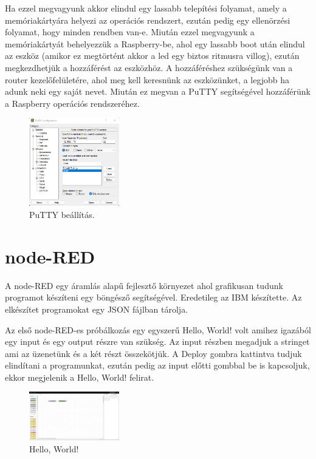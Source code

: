 \documentclass[a4paper,12pt,oneside]{report}
\begin{document}
Ha ezzel megvagyunk akkor elindul egy lassabb telepítési folyamat, amely a memóriakártyára helyezi az operációs rendszert, ezután pedig
egy ellenörzési folyamat, hogy minden rendben van-e.
Miután ezzel megvagyunk a memóriakártyát behelyezzük a Raspberry-be, ahol egy lassabb boot után elindul az eszköz (amikor ez megtörtént
akkor a led egy biztos ritmusra villog), ezután megkezdhetjük a hozzáférést az eszközhöz. 
A hozzáféréshez szükségünk van a router kezelőfelületére, ahol meg kell keresnünk az eszközünket, a legjobb ha adunk neki
egy saját nevet. Miután ez megvan a PuTTY segítségével hozzáférünk a Raspberry operációs rendszeréhez.

\begin{figure}[htbp]
	\centering
	\includegraphics[width=0.35\textwidth]{fig/putty.png}
	\caption{PuTTY beállítás.}
	\label{fig-putty}
\end{figure}

\chapter{node-RED}

A node-RED egy áramlás alapű fejlesztő környezet ahol grafikusan tudunk programot készíteni egy böngésző segítségével. Eredetileg az IBM
készítette. Az elkészítet programokat egy JSON fájlban tárolja.

Az első node-RED-es próbálkozás egy egyszerű Hello, World! volt amihez igazából egy input és egy output részre van szükség.
Az input részben megadjuk a stringet ami az üzenetünk és a két részt összekötjük. A Deploy gombra kattintva tudjuk elindítani a
programunkat, ezután pedig az input előtti gombbal be is kapcsoljuk, ekkor megjelenik a Hello, World! felirat.

\begin{figure}[htbp]
	\centering
	\includegraphics[width=0.35\textwidth]{fig/Hello, World.png}
	\caption{Hello, World!}
	\label{fig-Hello, World}
\end{figure}
\end{document}
